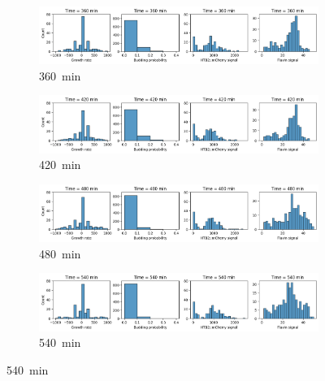 \begin{figure}
  \centering
  \begin{subfigure}[htpb]{0.9\textwidth}
   \centering
   \includegraphics[width=\textwidth]{19972_distribs_0360}
   \caption{
     \SI{360}{\minute}
   }
   \label{fig:biology-starvation-distribs-0360}
  \end{subfigure}

  \begin{subfigure}[htpb]{0.9\textwidth}
   \centering
   \includegraphics[width=\textwidth]{19972_distribs_0420}
   \caption{
     \SI{420}{\minute}
   }
   \label{fig:biology-starvation-distribs-0420}
  \end{subfigure}

  \begin{subfigure}[htpb]{0.9\textwidth}
   \centering
   \includegraphics[width=\textwidth]{19972_distribs_0480}
   \caption{
     \SI{480}{\minute}
   }
   \label{fig:biology-starvation-distribs-0480}
  \end{subfigure}

  \begin{subfigure}[htpb]{0.9\textwidth}
   \centering
   \includegraphics[width=\textwidth]{19972_distribs_0540}
   \caption{
     \SI{540}{\minute}
   }
   \label{fig:biology-starvation-distribs-0540}
  \end{subfigure}


\end{figure}

